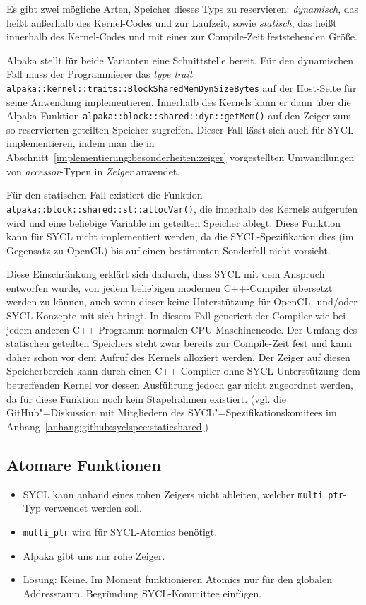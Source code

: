 Es gibt zwei mögliche Arten, Speicher dieses Typs zu reservieren:
\textit{dynamisch}, das heißt außerhalb des Kernel-Codes und zur Laufzeit, sowie
\textit{statisch}, das heißt innerhalb des Kernel-Codes und mit einer zur
Compile-Zeit feststehenden Größe.

Alpaka stellt für beide Varianten eine Schnittstelle bereit. Für den dynamischen
Fall muss der Programmierer das \textit{type trait}
\texttt{alpaka::kernel::traits::BlockSharedMemDynSizeBytes} auf der Host-Seite
für seine Anwendung implementieren. Innerhalb des Kernels kann er dann über die
Alpaka-Funktion \texttt{alpaka::block::shared::dyn::getMem()} auf den Zeiger
zum so reservierten geteilten Speicher zugreifen. Dieser Fall lässt sich auch
für SYCL implementieren, indem man die in
Abschnitt~\ref{implementierung:besonderheiten:zeiger} vorgestellten
Umwandlungen von \textit{accessor}-Typen in \textit{Zeiger} anwendet.

Für den statischen Fall existiert die Funktion
\texttt{alpaka::block::shared::st::allocVar()}, die innerhalb des Kernels
aufgerufen wird und eine beliebige Variable im geteilten Speicher ablegt. Diese
Funktion kann für SYCL nicht implementiert werden, da die SYCL-Spezifikation
dies (im Gegensatz zu OpenCL) bis auf einen bestimmten Sonderfall
\cite[siehe][Abschnitt 4.8.5.3]{sycl2019} nicht vorsieht.

Diese Einschränkung erklärt sich dadurch, dass SYCL mit dem Anspruch entworfen
wurde, von jedem beliebigen modernen C++-Compiler übersetzt werden zu können,
auch wenn dieser keine Unterstützung für OpenCL- und/oder SYCL-Konzepte mit sich
bringt. In diesem Fall generiert der Compiler wie bei jedem anderen C++-Programm
normalen CPU-Maschinencode. Der Umfang des statischen geteilten Speichers steht
zwar bereits zur Compile-Zeit fest und kann daher schon vor dem Aufruf des
Kernels alloziert werden. Der Zeiger auf diesen Speicherbereich kann durch einen
C++-Compiler ohne SYCL-Unterstützung dem betreffenden Kernel vor dessen
Ausführung jedoch gar nicht zugeordnet werden, da für diese Funktion noch kein
Stapelrahmen existiert. (vgl. die GitHub"=Diskussion mit Mitgliedern des
SYCL"=Spezifikationskomitees im
Anhang~\ref{anhang:github:syclspec:staticshared})

\subsection{Atomare Funktionen}\label{implementierung:probleme:atomics}

\begin{itemize}
    \item SYCL kann anhand eines rohen Zeigers nicht ableiten, welcher
          \texttt{multi\_ptr}-Typ verwendet werden soll.
    \item \texttt{multi\_ptr} wird für SYCL-Atomics benötigt.
    \item Alpaka gibt uns nur rohe Zeiger.
    \item Lösung: Keine. Im Moment funktionieren Atomics nur für den globalen
          Addressraum. Begründung SYCL-Kommittee einfügen.
\end{itemize}

